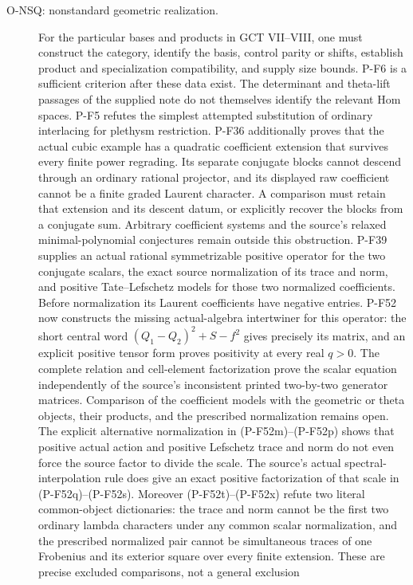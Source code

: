 \begin{description}
\item[O-NSQ: nonstandard geometric realization.]
For the particular bases and products in GCT VII--VIII, one must construct
the category, identify the basis, control parity or shifts, establish
product and specialization compatibility, and supply size bounds.
P-F6 is a sufficient criterion after these data exist. The determinant
and theta-lift passages of the supplied note do not themselves identify
the relevant Hom spaces. P-F5 refutes the simplest attempted substitution
of ordinary interlacing for plethysm restriction.
P-F36 additionally proves that the actual cubic example has a
quadratic coefficient extension that survives every finite power
regrading. Its separate conjugate blocks cannot descend through
an ordinary rational projector, and its displayed raw coefficient
cannot be a finite graded Laurent character. A comparison must
retain that extension and its descent datum, or explicitly recover
the blocks from a conjugate sum. Arbitrary coefficient systems
and the source's relaxed minimal-polynomial conjectures remain
outside this obstruction.
P-F39 supplies an actual rational symmetrizable positive operator
for the two conjugate scalars, the exact source normalization of
its trace and norm, and positive Tate--Lefschetz models for those
two normalized coefficients. Before normalization its Laurent
coefficients have negative entries. P-F52 now constructs the
missing actual-algebra intertwiner for this operator: the short
central word $(Q_1-Q_2)^2+S-f^2$ gives precisely its matrix,
and an explicit positive tensor form proves positivity at every
real $q>0$. The complete relation and cell-element factorization
prove the scalar equation independently of the source's
inconsistent printed two-by-two generator matrices. Comparison
of the coefficient models with the geometric or theta objects,
their products, and the prescribed normalization remains open.
The explicit alternative normalization in (P-F52m)--(P-F52p)
shows that positive actual action and positive Lefschetz trace
and norm do not even force the source factor to divide the scale.
The source's actual spectral-interpolation rule does give an
exact positive factorization of that scale in (P-F52q)--(P-F52s).
Moreover (P-F52t)--(P-F52x) refute two literal common-object
dictionaries: the trace and norm cannot be the first two ordinary
lambda characters under any common scalar normalization, and
the prescribed normalized pair cannot be simultaneous traces of
one Frobenius and its exterior square over every finite extension.
These are precise excluded comparisons, not a general exclusion

\end{description}
